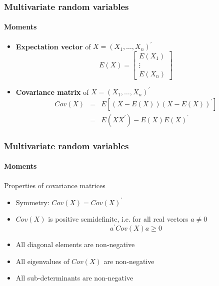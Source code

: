 \documentclass[notes=show]{beamer}
\begin{document}
\begin{frame}\frametitle{Multivariate random variables}\framesubtitle{Moments}
\begin{itemize}
    \item \textbf{Expectation vector} of $X=\left( X_{1},\ldots ,X_{n}\right) ^{\prime }$%
        \begin{equation*}
            E\left( X\right) =\left[
            \begin{array}{c}
            E\left( X_{1}\right) \\
            \vdots \\
            E\left( X_{n}\right)
            \end{array}
            \right]
        \end{equation*}
    \item \textbf{Covariance matrix} of $X=\left( X_{1},\ldots ,X_{n}\right) ^{\prime }$%
        \begin{eqnarray*}
            Cov(X) &=&E\left[ \left( X-E(X)\right) \left( X-E(X)\right) ^{\prime }\right]\\
            &=&E(XX^{\prime })-E(X)E(X)^{\prime }
        \end{eqnarray*}
    \end{itemize}
\end{frame}


\begin{frame}\frametitle{Multivariate random variables}\framesubtitle{Moments}
Properties of covariance matrices
\begin{itemize}
    \item Symmetry: $Cov(X)=Cov(X)^{\prime }$
    \item $Cov(X)$ is positive semidefinite, i.e. for all real vectors $a\neq 0$%
        \begin{equation*}
            a^{\prime }Cov(X)a\geq 0
        \end{equation*}
    \item All diagonal elements are non-negative
    \item All eigenvalues of $Cov(X)$ are non-negative
    \item All sub-determinants are non-negative
    \end{itemize}
\end{frame}
\end{document}
